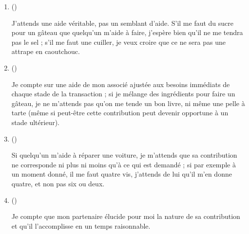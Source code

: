 \begin{keybox}
\begin{enumerate}[label=\arabic*.,leftmargin=6mm]
\item (\hspace{15mm})

J’attends une aide véritable, pas un semblant d’aide. S’il me faut du sucre pour un gâteau que quelqu’un m’aide à faire, j’espère bien qu’il ne me tendra pas le sel ; s’il me faut une cuiller, je veux croire que ce ne sera pas une attrape en caoutchouc.
\item (\hspace{15mm})

Je compte sur une aide de mon associé ajustée aux besoins immédiats de chaque stade de la transaction ; si je mélange des ingrédients pour faire un gâteau, je ne m’attends pas qu’on me tende un bon livre, ni même une pelle à tarte (même si peut-être cette contribution peut devenir opportune à un stade ultérieur).
\item (\hspace{15mm})

Si quelqu’un m’aide à réparer une voiture, je m’attends que sa contribution ne corresponde ni plus ni moins qu’à ce qui est demandé ; si par exemple à un moment donné, il me faut quatre vis, j’attends de lui qu’il m’en donne quatre, et non pas six ou deux.
\item (\hspace{15mm})

Je compte que mon partenaire élucide pour moi la nature de sa contribution et qu’il l’accomplisse en un temps raisonnable.
\end{enumerate}
\end{keybox}

